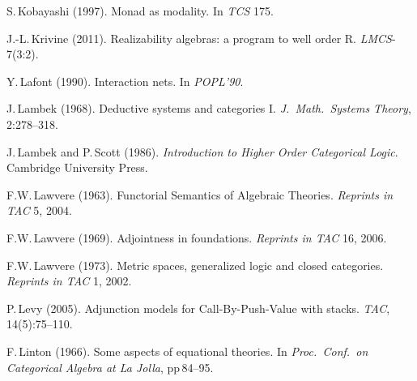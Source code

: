 \documentclass[11pt,twocolumn]{article}
\begin{document}
{\begin{thebibliography}{000}

S.\,Kobayashi (1997).
\newblock Monad as modality.
\newblock In \emph{TCS} 175.

J.-L.\,Krivine (2011).
\newblock Realizability algebras: a program to well order R.
\newblock \emph{LMCS}-7(3:2).

Y.\,Lafont (1990).
\newblock Interaction nets.
\newblock In \emph{POPL'90}.

J.\,Lambek (1968).
\newblock Deductive systems and categories I.
\newblock \emph{J.\ Math.\ Systems Theory}, 2:278--318.


J.\,Lambek and P.\,Scott (1986).
\newblock \emph{Introduction to Higher Order Categorical Logic}.
\newblock Cambridge University Press.

F.W.\,Lawvere (1963). %
\newblock Functorial Semantics of Algebraic Theories. %
\newblock \emph{Reprints in TAC} 5, 2004.
  
F.W.\,Lawvere (1969).
\newblock Adjointness in foundations.
\newblock \emph{Reprints in TAC} 16, 2006.

F.W.\,Lawvere (1973).
\newblock Metric spaces, generalized logic and closed categories.
\newblock \emph{Reprints in TAC} 1, 2002.


P.\,Levy (2005).
\newblock Adjunction models for Call-By-Push-Value with stacks.
\newblock \emph{TAC}, 14(5):75--110.

F.\,Linton (1966).
\newblock Some aspects of equational theories.
\newblock In {\em Proc.\ Conf.\ on Categorical Algebra at La Jolla}, pp\,84--95.



\end{thebibliography}}
\end{document}
